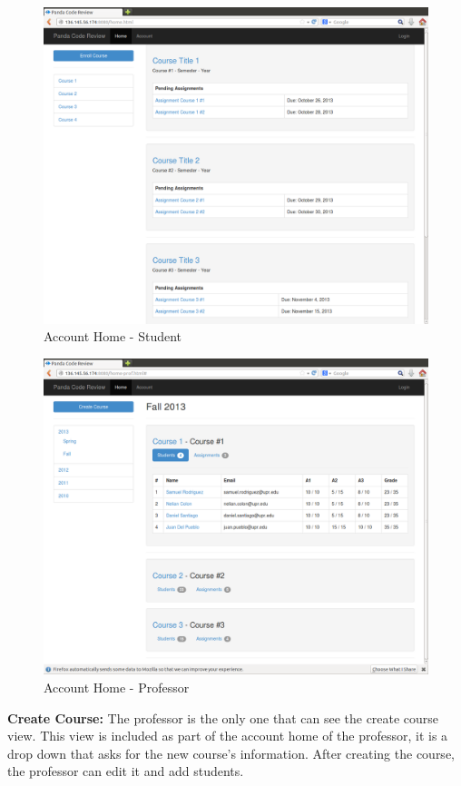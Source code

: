 \begin{figure}[H]
	\centering
	\includegraphics[width=\textwidth]{img/courses}
	\caption{Account Home - Student}
\end{figure}

\begin{figure}[H]
	\centering
	\includegraphics[width=\textwidth]{img/courses-prof}
	\caption{Account Home - Professor}
\end{figure}

\textbf{Create Course:} The professor is the only one that can see the
create course view. This view is included as part of the account home of the
professor, it is a drop down that asks for the new course's information. After
creating the course, the professor can edit it and add students.

